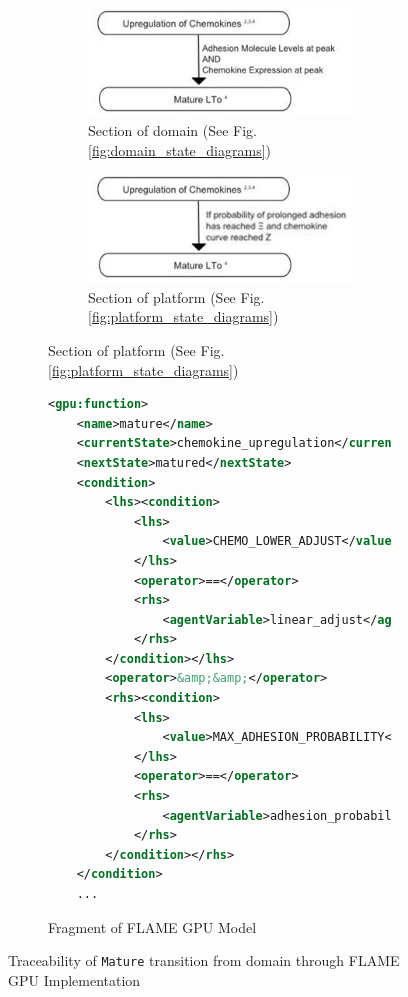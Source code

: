\documentclass{UoYCSproject}
\begin{document}
\begin{figure}[htbp]
\begin{subfigure}{0.5\textwidth}
\begin{subfigure}{\textwidth}
\centering
\includegraphics[width=\textwidth]{Appendix/LTo_Domain_Trace}
\caption{Section of \gls{domain} (See Fig. \ref{fig:domain_state_diagrams})}
\bigskip
\bigskip
\end{subfigure}

\begin{subfigure}{\textwidth}
\centering
\includegraphics[width=\textwidth]{Appendix/LTo_Platform_Trace}
\caption{Section of \gls{platform} (See Fig. \ref{fig:platform_state_diagrams})}
\end{subfigure}

\end{subfigure}
\begin{subfigure}{0.5\textwidth}
\begin{lstlisting}[language=XML, basicstyle=\tiny]
<gpu:function>
    <name>mature</name>
    <currentState>chemokine_upregulation</currentState>
    <nextState>matured</nextState>
    <condition>
        <lhs><condition>
            <lhs>
                <value>CHEMO_LOWER_ADJUST</value>
            </lhs>
            <operator>==</operator>
            <rhs>
                <agentVariable>linear_adjust</agentVariable>
            </rhs>
        </condition></lhs>
        <operator>&amp;&amp;</operator>
        <rhs><condition>
            <lhs>
                <value>MAX_ADHESION_PROBABILITY</value>
            </lhs>
            <operator>==</operator>
            <rhs>
                <agentVariable>adhesion_probability</agentVariable>
            </rhs>
        </condition></rhs>
    </condition>
    ...
\end{lstlisting}
\caption{Fragment of \gls{FLAME GPU} Model}
\end{subfigure}
\caption{Traceability of \texttt{Mature} transition from \gls{domain} through \gls{FLAME GPU} Implementation}
\label{fig:traceability_condition}
\end{figure}
\end{document}
